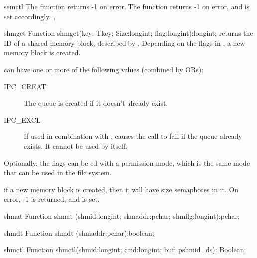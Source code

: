 \begin{function}{semctl}
The function returns -1 on error.
\Errors
The function returns -1 on error, and  is set accordingly.
\SeeAlso
{}, 
\end{function}

\html{}


\begin{function}{shmget}
\Declaration
Function shmget(key: Tkey; Size:longint; flag:longint):longint;
\Description
{} returns the ID of a shared memory block, described by .
Depending on the flags in , a new memory block is created.

 can have one or more of the following values (combined by ORs):
\begin{description}
\item[IPC\_CREAT] The queue is created if it doesn't already exist.
\item[IPC\_EXCL] If used in combination with , causes the
call to fail if the queue already exists. It cannot be used by itself.
\end{description}
Optionally, the flags can be ed with a permission mode, which is the
same mode that can be used in the file system.

if a new memory block is created, then it will have size 
semaphores in it.
\Errors
On error, -1 is returned, and  is set.
\SeeAlso
\end{function}

\begin{function}{shmat}
\Declaration
Function shmat (shmid:longint; shmaddr:pchar; shmflg:longint):pchar;
\Description
\Errors
\SeeAlso
\end{function}

\begin{function}{shmdt}
\Declaration
Function shmdt (shmaddr:pchar):boolean;
\Description
\Errors
\SeeAlso
\end{function}

\begin{function}{shmctl}
\Declaration
Function shmctl(shmid:longint; cmd:longint; buf: pshmid\_ds): Boolean;
\Description
\Errors
\SeeAlso
\end{function}

\html{}

